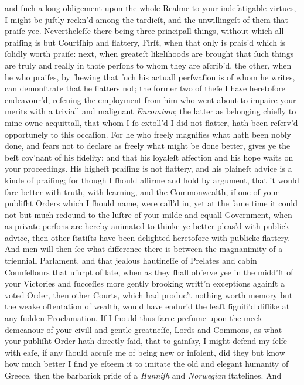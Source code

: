 and ſuch a long obligement upon the whole Realme to your indefatigable virtues,
I might be juſtly reckn'd among the tardieſt, and the unwillingeſt of them that
praiſe yee.  Nevertheleſſe there being three principall things, without which
all praiſing is but Courtſhip and flattery, Firſt, when that only is prais'd
which is ſolidly worth praiſe: next, when greateſt likelihoods are brought that
ſuch things are truly and really in thoſe perſons to whom they are aſcrib'd, the
other, when he who praiſes, by ſhewing that ſuch his actuall perſwaſion is of
whom he writes, can demonſtrate that he flatters not; the former two of theſe I
have heretofore endeavour'd, reſcuing the employment from him who went about to
impaire your merits with a triviall and malignant \textit{Encomium}; the latter
as belonging chiefly to mine owne acquittall, that whom I ſo extoll'd I did not
flatter, hath been reſerv'd opportunely to this occaſion.  For he who freely
magnifies what hath been nobly done, and fears not to declare as freely what
might be done better, gives ye the beſt cov'nant of his fidelity; and that his
loyaleſt affection and his hope waits on your proceedings.  His higheſt praiſing
is not flattery, and his plaineſt advice is a kinde of praiſing; for though I
ſhould affirme and hold by argument, that it would fare better with truth, with
learning, and the Commonwealth, if one of your publiſht Orders which I ſhould
name, were call'd in, yet at the ſame time it could not but much redound to the
luſtre of your milde and equall Government, when as private perſons are hereby
animated to thinke ye better pleas'd with publick advice, then other ſtatiſts
have been delighted heretofore with publicke flattery.  And men will then ſee
what difference there is between the magnanimity of a trienniall Parlament, and
that jealous hautineſſe of Prelates and cabin Counſellours that uſurpt of late,
when as they ſhall obſerve yee in the midd'ſt of your Victories and ſucceſſes
more gently brooking writt'n exceptions againſt a voted Order, then other
Courts, which had produc't nothing worth memory but the weake oſtentation of
wealth, would have endur'd the leaſt ſignifi'd diſlike at any ſudden
Proclamation.  If I ſhould thus farre preſume upon the meek demeanour of your
civill and gentle greatneſſe, Lords and Commons, as what your publiſht Order
hath directly ſaid, that to gainſay, I might defend my ſelfe with eaſe, if any
ſhould accuſe me of being new or inſolent, did they but know how much better I
find ye eſteem it to imitate the old and elegant humanity of Greece, then the
barbarick pride of a \textit{Hunniſh} and \textit{Norwegian} ſtatelines.  And
